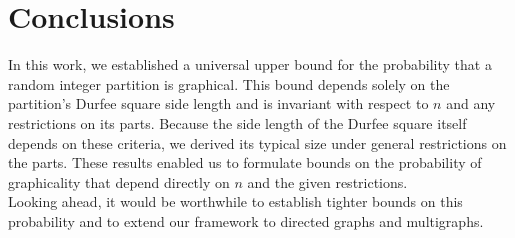 \documentclass[pdflatex,sn-mathphys-num]{sn-jnl}%
\theoremstyle{thmstyleone}%
\theoremstyle{thmstyletwo}%
\theoremstyle{thmstylethree}%
\theoremstyle{thmstylethree}%
\theoremstyle{thmstylethree}%
\begin{document}
\vspace{0.5cm}

\section*{Conclusions}
In this work, we established a universal upper bound for the probability that a random integer partition is graphical. This bound depends solely on the partition's Durfee square side length and is invariant with respect to $n$ and any restrictions on its parts. Because the side length of the Durfee square itself depends on these criteria, we derived its typical size under general restrictions on the parts. These results enabled us to formulate bounds on the probability of graphicality that depend directly on $n$ and the given restrictions. \\
Looking ahead, it would be worthwhile to establish tighter bounds on this probability and to extend our framework to directed graphs and multigraphs.

\newpage
\end{document}
